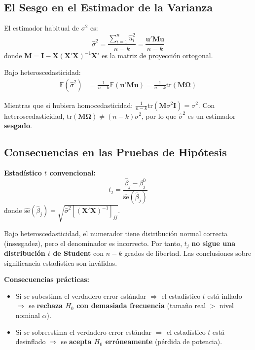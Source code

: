 \documentclass[12pt,a4paper]{report}
\theoremstyle{definition}
\theoremstyle{remark}
\newcommand{\E}{\mathbb{E}}
\newcommand{\betahat}{\hat{\beta}}
\newcommand{\uhat}{\hat{u}}
\newcommand{\sigmahat}{\hat{\sigma}}
\begin{document}
\subsection{El Sesgo en el Estimador de la Varianza}

El estimador habitual de $\sigma^2$ es:
\begin{equation}
  \sigmahat^2 = \frac{\sum_{i=1}^n \uhat_i^2}{n - k} = \frac{\mathbf{u}'\mathbf{M}\mathbf{u}}{n - k}
  \label{eq:sigma2_hat}
\end{equation}
donde $\mathbf{M} = \mathbf{I} - \mathbf{X}(\mathbf{X}'\mathbf{X})^{-1}\mathbf{X}'$ es la matriz de proyección ortogonal.

Bajo heteroscedasticidad:
\begin{align}
  \E(\sigmahat^2) &= \frac{1}{n-k}\E(\mathbf{u}'\mathbf{M}\mathbf{u}) = \frac{1}{n-k}\mathrm{tr}(\mathbf{M}\boldsymbol{\Omega})
  \label{eq:e_sigma2}
\end{align}

Mientras que si hubiera homocedasticidad: $\frac{1}{n-k}\mathrm{tr}(\mathbf{M}\sigma^2\mathbf{I}) = \sigma^2$. Con heteroscedasticidad, $\mathrm{tr}(\mathbf{M}\boldsymbol{\Omega}) \neq (n-k)\sigma^2$, por lo que $\sigmahat^2$ es un estimador \textbf{sesgado}.

\subsection{Consecuencias en las Pruebas de Hipótesis}

\begin{tcolorbox}[alertastyle, title={Invalidez de las Pruebas $t$ y $F$}]
  \textbf{Estadístico $t$ convencional:}
  \begin{equation}
    t_j = \frac{\betahat_j - \beta_j^0}{\widehat{\text{se}}(\betahat_j)}
    \label{eq:t_stat}
  \end{equation}
  donde $\widehat{\text{se}}(\betahat_j) = \sqrt{\sigmahat^2 [(\mathbf{X}'\mathbf{X})^{-1}]_{jj}}$.

  Bajo heteroscedasticidad, el numerador tiene distribución normal correcta (insesgadez), pero el denominador es incorrecto. Por tanto, $t_j$ \textbf{no sigue una distribución $t$ de Student} con $n-k$ grados de libertad. Las conclusiones sobre significancia estadística son inválidas.

  \textbf{Consecuencias prácticas:}
  \begin{itemize}
    \item Si $\widehat{\text{se}}$ subestima el verdadero error estándar $\Rightarrow$ el estadístico $t$ está inflado $\Rightarrow$ se \textbf{rechaza $H_0$ con demasiada frecuencia} (tamaño real $>$ nivel nominal $\alpha$).
    \item Si $\widehat{\text{se}}$ sobreestima el verdadero error estándar $\Rightarrow$ el estadístico $t$ está desinflado $\Rightarrow$ se \textbf{acepta $H_0$ erróneamente} (pérdida de potencia).
  \end{itemize}
\end{tcolorbox}
\end{document}
